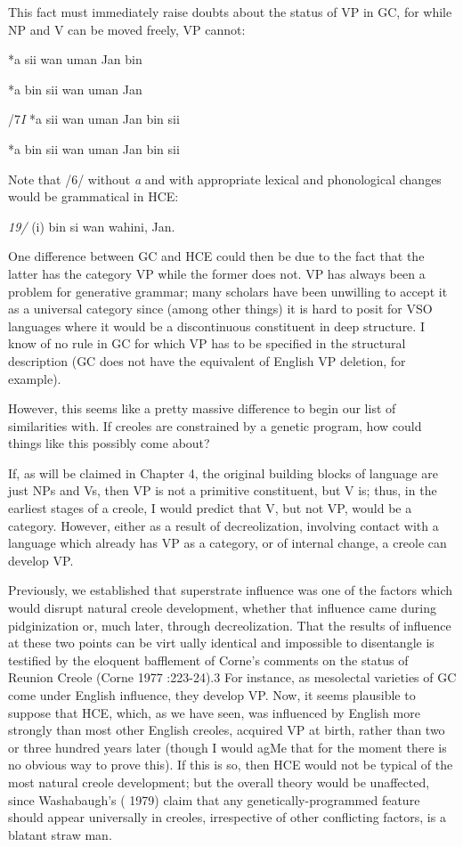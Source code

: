 This fact must immediately raise doubts about the status of
VP in GC, for while NP and V can be moved freely, VP cannot:

\ea\label{ex:5}
 *a sii wan uman Jan bin
\glt
\z

\ea\label{ex:6}
 *a bin sii wan uman Jan
\glt
\z

/7\textit{I} *a sii wan uman Jan bin sii

\ea\label{ex:8}
 *a bin sii wan uman Jan bin sii
\glt
\z

Note that /6/ without \textit{a} and with appropriate lexical and phonological changes would be grammatical in HCE:

\textit{19/ }(i) bin si wan wahini, Jan.

One difference between GC and HCE could then be due to the fact that the latter has the category VP while the former does not. VP has always been a problem for generative grammar; many scholars
have been unwilling to accept it as a universal category since (among
other things) it is hard to posit for VSO languages where it would be a discontinuous constituent in deep structure. I know of no rule in GC for which VP has to be specified in the structural description (GC does not have the equivalent of English VP deletion, for example).

However, this seems like a pretty massive difference to begin our list of similarities with. If creoles are constrained by a genetic program, how could things like this possibly come about?

If, as will be claimed in Chapter 4, the original building blocks of language are just NPs and Vs, then VP is not a primitive constituent, but V is; thus, in the earliest stages of a creole, I would predict that V, but not VP, would be a category. However, either as a result of de\-creolization, involving contact with a language which already has VP as a category, or of internal change, a creole can develop VP.

Previously, we established that superstrate influence was one of the factors which would disrupt natural creole development, whether that influence came during pidginization or, much later, through
decreolization. That the results of influence at these two points can be virt ually identical and impossible to disentangle is testified by the elo\-quent bafflement of Corne's comments on the status of Reunion Creole (Corne 1977 :223{}-24).3 For instance, as mesolectal varieties of GC come under English influence, they develop VP. Now, it seems plausible to suppose that HCE, which, as we have seen, was influenced by English more strongly than most other English creoles, acquired VP at birth, rather than two or three hundred years later (though I would agMe that for the moment there is no obvious way to prove this). If this is so, then HCE would not be typical of the most natural creole development; but the overall theory would be unaffected, since Washabaugh's ( 1979) claim that any genetically-programmed feature should appear universally in creoles, irrespective of other conflicting factors, is a blatant straw man.


